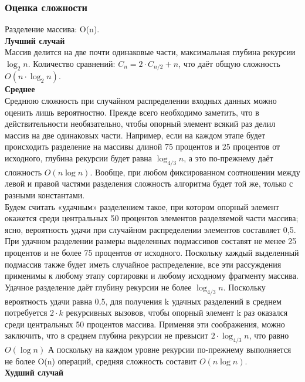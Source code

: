 \documentclass[a4paper]{article}
\begin{document}
\begin{itemize}
\subsubsection{Оценка сложности}
Разделение массива: O(n). \\
\textbf{Лучший случай} \\
Массив делится на две почти одинаковые части, максимальная глубина рекурсии $\log_2 n$. Количество сравнений: $C_n = 2 \cdot C_{n/2} + n$, что даёт общую сложность $O(n \cdot \log_2 n)$. \\
\textbf{Среднее} \\
Среднюю сложность при случайном распределении входных данных можно оценить лишь вероятностно.
Прежде всего необходимо заметить, что в действительности необязательно, чтобы опорный элемент всякий раз делил массив на две одинаковых части. Например, если на каждом этапе будет происходить разделение на массивы длиной 75 процентов и 25 процентов от исходного, глубина рекурсии будет равна $\log_{4/3} n$, а это по-прежнему даёт сложность $O(n \log n)$. Вообще, при любом фиксированном соотношении между левой и правой частями разделения сложность алгоритма будет той же, только с разными константами. \\
Будем считать «удачным» разделением такое, при котором опорный элемент окажется среди центральных 50 процентов элементов разделяемой части массива; ясно, вероятность удачи при случайном распределении элементов составляет 0,5. При удачном разделении размеры выделенных подмассивов составят не менее 25 процентов и не более 75 процентов от исходного. Поскольку каждый выделенный подмассив также будет иметь случайное распределение, все эти рассуждения применимы к любому этапу сортировки и любому исходному фрагменту массива. \\
Удачное разделение даёт глубину рекурсии не более $\log_{4/3} n$. Поскольку вероятность удачи равна 0,5, для получения k удачных разделений в среднем потребуется $2 \cdot k$ рекурсивных вызовов, чтобы опорный элемент k раз оказался среди центральных 50 процентов массива. Применяя эти соображения, можно заключить, что в среднем глубина рекурсии не превысит $2 \cdot \log_{4/3} n$, что равно $O(\log n)$ А поскольку на каждом уровне рекурсии по-прежнему выполняется не более O(n) операций, средняя сложность составит $O(n \log n)$. \\
\textbf{Худший случай} \\

\end{itemize}
\end{document}
